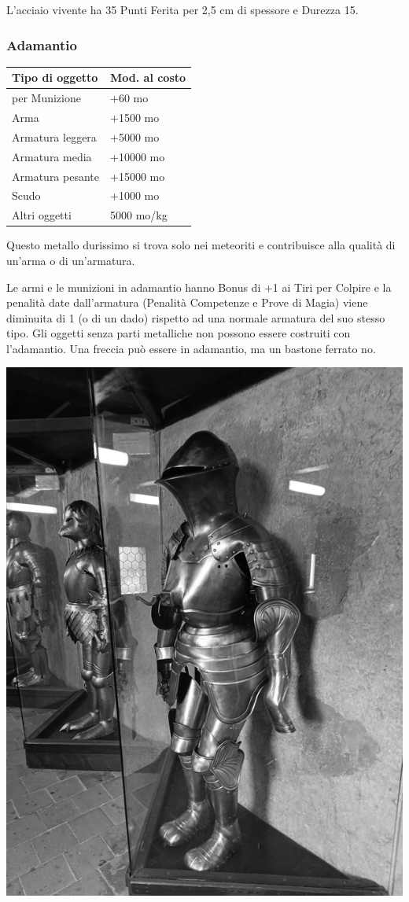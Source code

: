 \begin{multicols}{2}
L'acciaio vivente ha 35 Punti Ferita per 2,5 cm di spessore e Durezza 15.

\subsubsection{Adamantio}

\label{adamantio}

\begin{tabularx}{0.48\textwidth}{Xl}
\textbf{Tipo di oggetto} & \textbf{Mod. al costo}\\
\toprule
per Munizione & +60 mo\\
Arma & +1500 mo\\
Armatura leggera & +5000 mo\\
Armatura media & +10000 mo\\
Armatura pesante & +15000 mo\\
Scudo & +1000 mo\\
Altri oggetti & 5000 mo/kg
\end{tabularx}

\medskip
Questo metallo durissimo si trova solo nei meteoriti e contribuisce alla qualità di un'arma o di un'armatura.

Le armi e le munizioni in adamantio hanno Bonus di +1 ai Tiri per Colpire e la penalità date dall'armatura (Penalità Competenze e Prove di Magia) viene diminuita di 1 (o di un dado) rispetto ad una normale armatura del suo stesso tipo. Gli oggetti senza parti metalliche non possono essere costruiti con l'adamantio. Una freccia può essere in adamantio, ma un bastone ferrato no.


\begin{center}
	\includegraphics[width=0.8\linewidth]{immagini/armature-praga_grayscale.png}


\end{center}
\end{multicols}
